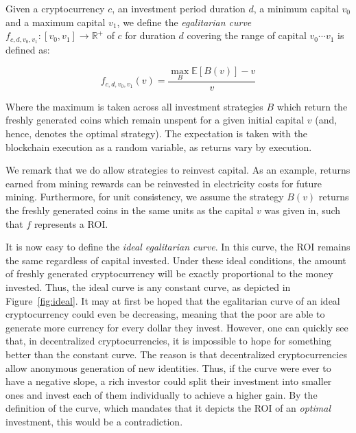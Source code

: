 \begin{definition}
  Given a cryptocurrency $c$, an investment period duration $d$, a minimum
  capital $v_0$ and a maximum capital $v_1$, we define the
  \emph{egalitarian curve}
  $f_{c,d,v_0,v_1}: [v_0, v_1] \longrightarrow \mathbb{R}^+$ of $c$ for
  duration $d$ covering the range of capital $v_0 \cdots v_1$ is defined as:

  \[
  f_{c,d,v_0,v_1}(v) = \frac{\max_B{\mathbb{E}[B(v)]} - v}{v}
  \]

  Where the maximum is taken across all investment strategies $B$ which return
  the freshly generated coins which remain unspent for a given initial capital
  $v$ (and, hence, denotes the optimal strategy). The expectation is taken with
  the blockchain execution as a random variable, as returns vary by execution.
\end{definition}

We remark that we do allow strategies to reinvest capital. As an example,
returns earned from mining rewards can be reinvested in electricity costs for
future mining. Furthermore, for unit consistency, we assume the strategy $B(v)$
returns the freshly generated coins in the same units as the capital $v$ was
given in, such that $f$ represents a ROI.

It is now easy to define the \emph{ideal egalitarian curve}. In this curve, the
ROI remains the same regardless of capital invested. Under these ideal
conditions, the amount of freshly generated cryptocurrency will be exactly
proportional to the money invested. Thus, the ideal curve is any constant curve,
as depicted in Figure~\ref{fig:ideal}. It may at first be hoped that the
egalitarian curve of an ideal cryptocurrency could even be decreasing, meaning
that the poor are able to generate more currency for every dollar they invest.
However, one can quickly see that, in decentralized cryptocurrencies, it is
impossible to hope for something better than the constant curve. The reason is
that decentralized cryptocurrencies allow anonymous generation of new
identities. Thus, if the curve were ever to have a negative slope, a rich
investor could split their investment into smaller ones and invest each of them
individually to achieve a higher gain. By the definition of the curve, which
mandates that it depicts the ROI of an \emph{optimal} investment, this would be
a contradiction.


